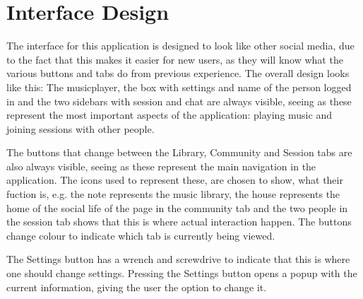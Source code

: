 \section{Interface Design}
The interface for this application is designed to look like other social media, due to the fact that this makes it easier for
 new users, as they will know what the various buttons and tabs do from previous experience. The overall design looks like this:
\clearpage
\noindent{}
The musicplayer, the box with settings and name of the person logged in and the two sidebars with session and chat are always
visible, seeing as these represent the most important aspects of the application: playing music and joining sessions with
other people. 

\vspace{10pt}
The buttons that change between the Library, Community and Session tabs are also always visible, seeing as
these represent the main navigation in the application. The icons used to represent these, are chosen to show, what their
fuction is, e.g. the note represents the music library, the house represents the home of the social life of the page in the
community tab and the two people in the session tab shows that this is where actual interaction happen. The buttons change
colour to indicate which tab is currently being viewed. 

\vspace{10pt}
The Settings button has a wrench and screwdrive to indicate that this
is where one should change settings. Pressing the Settings button opens a popup with the current information, giving the user the option to change it.

